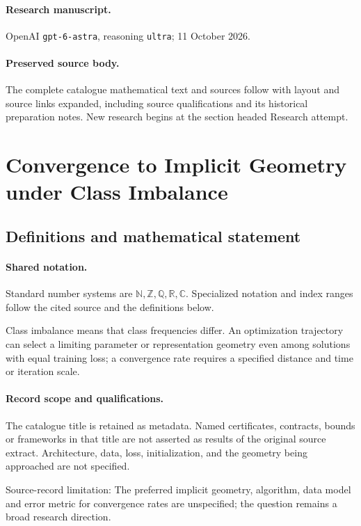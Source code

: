 \documentclass[11pt]{article}
\begin{document}
\paragraph{Research manuscript.} OpenAI \texttt{gpt-6-astra}, reasoning \texttt{ultra}; 11 October 2026.
\paragraph{Preserved source body.} The complete catalogue mathematical text and sources follow with layout and source links expanded, including source qualifications and its historical preparation notes. New research begins at the section headed Research attempt.

\section{Convergence to Implicit Geometry under Class Imbalance}\label{statement}

\subsection{Definitions and mathematical statement}

\paragraph{Shared notation.}Standard number systems are $\mathbb N,\mathbb Z,\mathbb Q,\mathbb R,\mathbb C$. Specialized notation and index ranges follow the cited source and the definitions below.


Class imbalance means that class frequencies differ. An optimization trajectory can select a limiting parameter or representation geometry even among solutions with equal training loss; a convergence rate requires a specified distance and time or iteration scale.
\paragraph{Record scope and qualifications.}
The catalogue title is retained as metadata. Named certificates, contracts, bounds or frameworks in that title are not asserted as results of the original source extract.
Architecture, data, loss, initialization, and the geometry being approached are not specified.

Source-record limitation: The preferred implicit geometry, algorithm, data model and error metric for convergence rates are unspecified; the question remains a broad research direction.
\end{document}
